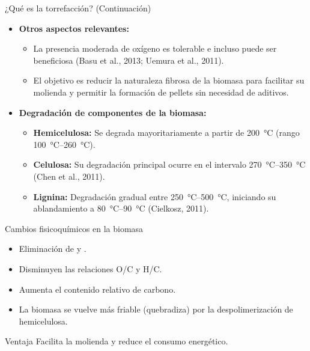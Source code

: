 \documentclass[main.tex]{subfiles}
\begin{document}
\begin{frame}{¿Qué es la torrefacción? (Continuación)}
  \begin{itemize}
    \item \textbf{Otros aspectos relevantes:}
      \begin{itemize}
        \item La presencia moderada de oxígeno es tolerable e incluso puede ser beneficiosa (Basu et al., 2013; Uemura et al., 2011).
        \item El objetivo es reducir la naturaleza fibrosa de la biomasa para facilitar su molienda y permitir la formación de pellets sin necesidad de aditivos.
      \end{itemize}

    \item \textbf{Degradación de componentes de la biomasa:}
      \begin{itemize}
        \item \textbf{Hemicelulosa:} Se degrada mayoritariamente a partir de \SI{200}{\celsius} (rango \SIrange{100}{260}{\celsius}).
        \item \textbf{Celulosa:} Su degradación principal ocurre en el intervalo \SIrange{270}{350}{\celsius} (Chen et al., 2011).
        \item \textbf{Lignina:} Degradación gradual entre \SIrange{250}{500}{\celsius}, iniciando su ablandamiento a \SIrange{80}{90}{\celsius} (Cielkosz, 2011).
      \end{itemize}
  \end{itemize}
\end{frame}

\begin{frame}{Cambios fisicoquímicos en la biomasa}
  \begin{itemize}
    \item Eliminación de  y .
    \item Disminuyen las relaciones O/C y H/C.
    \item Aumenta el contenido relativo de carbono.
    \item La biomasa se vuelve más friable (quebradiza) por la despolimerización de hemicelulosa.
  \end{itemize}
  \vspace{0.5em}
  \begin{alertblock}{Ventaja}
    Facilita la molienda y reduce el consumo energético.
  \end{alertblock}
\end{frame}
\end{document}
